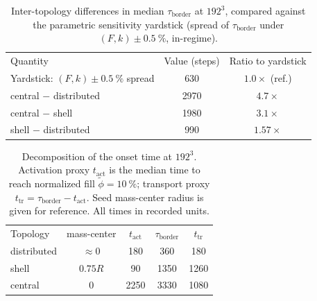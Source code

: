 \documentclass[aps,pre,preprint,superscriptaddress,nofootinbib,floatfix]{revtex4-2}
\newcommand{\tb}{\tau_{\mathrm{border}}}
\begin{document}
\begin{table}[htbp]
\caption{\label{tab:yardstick}Inter-topology differences in median $\tb$ at $192^3$, compared against the parametric sensitivity yardstick (spread of $\tb$ under $(F,k)\pm\SI{0.5}{\percent}$, in-regime).}
\begin{ruledtabular}
\begin{tabular}{lcc}
Quantity & Value (steps) & Ratio to yardstick \\
\colrule
Yardstick: $(F,k)\pm\SI{0.5}{\percent}$ spread & 630 & $1.0\times$ (ref.) \\
central $-$ distributed & 2970 & $4.7\times$ \\
central $-$ shell & 1980 & $3.1\times$ \\
shell $-$ distributed & 990 & $1.57\times$ \\
\end{tabular}
\end{ruledtabular}
\end{table}

\begin{table}[htbp]
\caption{\label{tab:decomp}Decomposition of the onset time at $192^3$. Activation proxy $t_{\mathrm{act}}$ is the median time to reach normalized fill $\tilde\phi=\SI{10}{\percent}$; transport proxy $t_{\mathrm{tr}}=\tb-t_{\mathrm{act}}$. Seed mass-center radius is given for reference. All times in recorded units.}
\begin{ruledtabular}
\begin{tabular}{lcccc}
Topology & mass-center & $t_{\mathrm{act}}$ & $\tb$ & $t_{\mathrm{tr}}$ \\
\colrule
distributed & ${\approx}0$ & 180 & 360 & 180 \\
shell & $0.75R$ & 90 & 1350 & 1260 \\
central & $0$ & 2250 & 3330 & 1080 \\
\end{tabular}
\end{ruledtabular}
\end{table}
\end{document}
